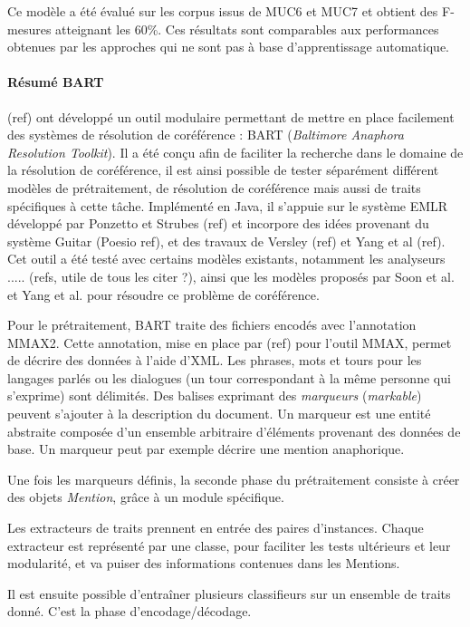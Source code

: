 \documentclass[a4paper,12pt]{article}
\begin{document}
Ce modèle a été évalué sur les corpus issus de MUC6 et MUC7 et obtient des F-mesures atteignant les 60\%. Ces résultats sont comparables aux performances obtenues par les approches qui ne sont pas à base d'apprentissage automatique.

\paragraph{Résumé BART}
(ref) ont développé un outil modulaire permettant de mettre en place facilement des systèmes de résolution de coréférence : BART (\textit{Baltimore Anaphora Resolution Toolkit}).
Il a été conçu afin de faciliter la recherche dans le domaine de la résolution de coréférence, il est ainsi possible de tester séparément différent modèles de prétraitement, de résolution de coréférence mais aussi de traits spécifiques à cette tâche.
Implémenté en Java, il s'appuie sur le système EMLR développé par Ponzetto et Strubes (ref) et incorpore des idées provenant du système Guitar (Poesio ref), et des travaux de Versley (ref) et Yang et al (ref).
Cet outil a été testé avec certains modèles existants, notamment les analyseurs ..... (refs, utile de tous les citer ?), ainsi que les modèles proposés par Soon et al. et Yang et al. pour résoudre ce problème de coréférence.

Pour le prétraitement, BART traite des fichiers encodés avec l'annotation MMAX2. Cette annotation, mise en place par (ref) pour l'outil MMAX, permet de décrire des données à l'aide d'XML. Les phrases, mots et tours pour les langages parlés ou les dialogues (un tour correspondant à la même personne qui s'exprime) sont délimités. Des balises exprimant des \textit{marqueurs} (\textit{markable}) peuvent s'ajouter à la description du document. Un marqueur est une entité abstraite composée d'un ensemble arbitraire d'éléments provenant des données de base. Un marqueur peut par exemple décrire une mention anaphorique.

Une fois les marqueurs définis, la seconde phase du prétraitement consiste à créer des objets \textit{Mention}, grâce à un module spécifique.

Les extracteurs de traits prennent en entrée des paires d'instances. Chaque extracteur est représenté par une classe, pour faciliter les tests ultérieurs et leur modularité, et va puiser des informations contenues dans les Mentions.

Il est ensuite possible d'entraîner plusieurs classifieurs sur un ensemble de traits donné. C'est la phase d'encodage/décodage.
\end{document}

